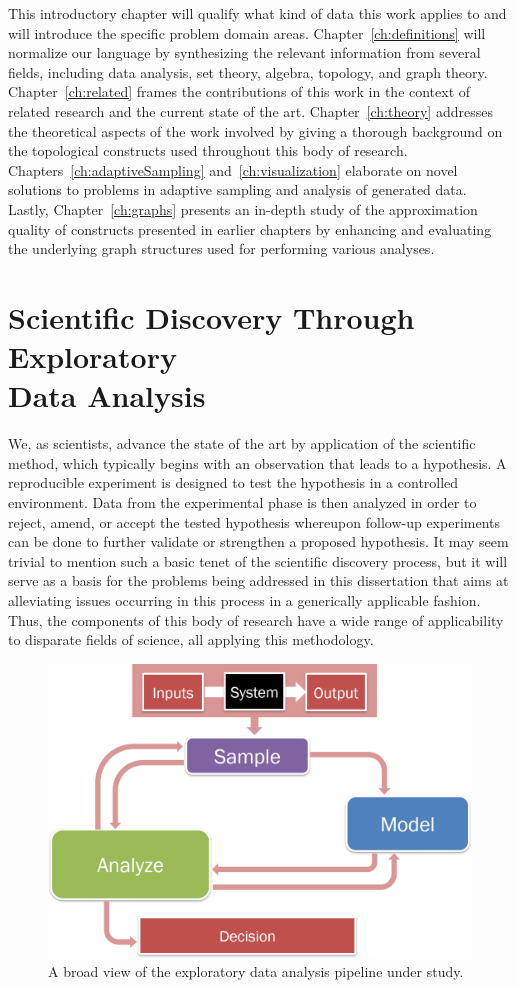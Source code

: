This introductory chapter will qualify what kind of data this work applies to and will introduce the specific problem domain areas.
%
Chapter~\ref{ch:definitions} will normalize our language by synthesizing the relevant information from several fields, including data analysis, set theory, algebra, topology, and graph theory.
%
Chapter~\ref{ch:related} frames the contributions of this work in the context of related research and the current state of the art.
%
Chapter~\ref{ch:theory} addresses the theoretical aspects of the work involved by giving a thorough background on the topological constructs used throughout this body of research.
%
Chapters~\ref{ch:adaptiveSampling} and~\ref{ch:visualization} elaborate on novel solutions to problems in adaptive sampling and analysis of generated data.
%
Lastly, Chapter~\ref{ch:graphs} presents an in-depth study of the approximation quality of constructs presented in earlier chapters by enhancing and evaluating the underlying graph structures used for performing various analyses.

\section{Scientific Discovery Through Exploratory\\Data Analysis}

We, as scientists, advance the state of the art by application of the scientific method, which typically begins with an observation that leads to a hypothesis.
%
A reproducible experiment is designed to test the hypothesis in a controlled environment.
%
Data from the experimental phase is then analyzed in order to reject, amend, or accept the tested hypothesis whereupon follow-up experiments can be done to further validate or strengthen a proposed hypothesis.
%
It may seem trivial to mention such a basic tenet of the scientific discovery process, but it will serve as a basis for the problems being addressed in this dissertation that aims at alleviating issues occurring in this process in a generically applicable fashion.
%
Thus, the components of this body of research have a wide range of applicability to disparate fields of science, all applying this methodology.

\begin{figure}[t]
  \centering
  \includegraphics[width=.65\textwidth]{figs/chap1/pipeline}
  \caption[Data collection cycle for scientific discovery]{A broad view of the exploratory data analysis pipeline under study.}
  \label{fig:dataCycle}
\end{figure}

